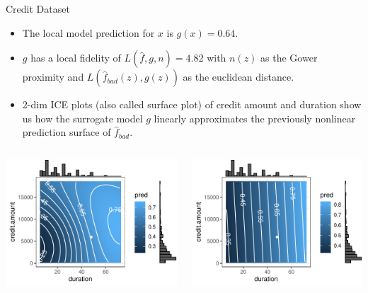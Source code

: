 \documentclass[aspectratio=169]{../latex_main/tntbeamer}  %
\begin{document}
\begin{frame}{Credit Dataset}

\vspace{-2em}
\begin{itemize}
	\item The local model prediction for $x$ is $g(x) = 0.64$. 
	\item $g$ has a local fidelity of $L(\hat{f}, g, n) = 4.82$ with $n(z)$ as the Gower proximity and $L(\hat{f}_{bad}(z), g(z))$ as the euclidean distance. 
	\item 2-dim ICE plots (also called surface plot) of credit amount and duration show us how the surrogate model $g$ linearly approximates the previously nonlinear prediction surface of $\hat{f}_{bad}$. 
\end{itemize}
\vspace{-2em}
 \begin{columns}
	\begin{column}{0.35\textwidth}
		\begin{center}
		\includegraphics[width=1\textwidth]{figure/lime_credit_ice1.pdf}
		\end{center}		
	\end{column}
	\begin{column}{0.35\textwidth}  
		\begin{center}
				\includegraphics[width=1\textwidth]{figure/lime_credit_ice2.pdf}

\end{center}
\end{column}
\end{columns}
\end{frame}
\end{document}
